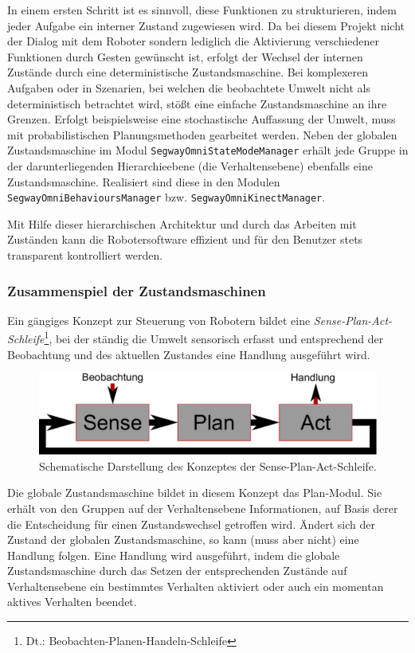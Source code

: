 In einem ersten Schritt ist es sinnvoll, diese Funktionen zu strukturieren, indem jeder Aufgabe ein 
interner Zustand zugewiesen wird. Da bei diesem Projekt nicht der Dialog mit dem Roboter sondern lediglich 
die Aktivierung verschiedener Funktionen durch Gesten gewünscht ist, erfolgt der Wechsel der internen 
Zustände durch eine deterministische Zustandsmaschine. Bei komplexeren 
Aufgaben oder in Szenarien, bei welchen die beobachtete Umwelt nicht als deterministisch betrachtet wird, stößt
eine einfache Zustandsmaschine an ihre Grenzen.
Erfolgt beispielsweise eine stochastische Auffassung der Umwelt, muss mit probabilistischen Planungsmethoden gearbeitet werden.
Neben der globalen Zustandsmaschine im Modul
\lstinline{SegwayOmniStateModeManager} erhält jede Gruppe in der darunterliegenden Hierarchieebene (die Verhaltensebene) ebenfalls eine Zustandsmaschine.
Realisiert sind diese in den Modulen \lstinline{SegwayOmniBehavioursManager} bzw. \lstinline{SegwayOmniKinectManager}.

Mit Hilfe dieser hierarchischen Architektur und durch das Arbeiten mit Zuständen kann die Robotersoftware effizient und für den Benutzer stets transparent kontrolliert werden.


\subsubsection{Zusammenspiel der Zustandsmaschinen}
\label{integration_umsetzung_zusammenspiel_sec}

Ein gängiges Konzept zur Steuerung von Robotern bildet 
eine \textit{Sense-Plan-Act-Schleife}\footnote{Dt.: Beobachten-Planen-Handeln-Schleife}, bei der 
ständig die Umwelt sensorisch erfasst und entsprechend der Beobachtung und des aktuellen Zustandes 
eine Handlung ausgeführt wird.
\begin{figure}[h]
	\label{fig:integration_sense_plan_act}
	\centering
	\includegraphics[scale=0.5]{graphics/SCHEMA-SensePlanAct.pdf}
	\caption{Schematische Darstellung des Konzeptes der Sense-Plan-Act-Schleife.}
\end{figure}
Die globale Zustandsmaschine bildet in diesem Konzept das Plan-Modul. Sie erhält von den Gruppen auf 
der Verhaltensebene Informationen, auf Basis derer die Entscheidung für einen Zustandswechsel getroffen wird.
Ändert sich der Zustand der globalen Zustandsmaschine, so kann (muss aber nicht) eine Handlung folgen.
Eine Handlung wird ausgeführt, indem die globale Zustandsmaschine durch das 
Setzen der entsprechenden Zustände auf Verhaltensebene ein bestimmtes Verhalten aktiviert oder auch ein momentan aktives Verhalten beendet.

